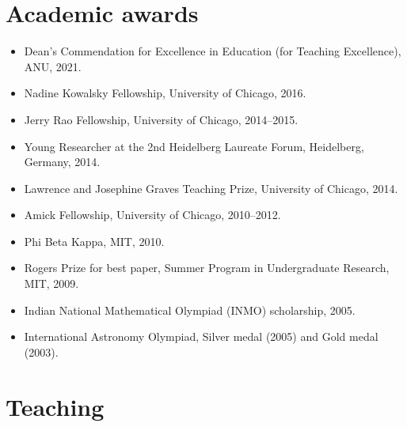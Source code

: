 \documentclass[a4paper]{moderncv}
\begin{document}
\section{Academic awards}
\label{sec:org06173a5}
\begin{itemize}
\item Dean's Commendation for Excellence in Education (for Teaching Excellence), ANU, 2021.
\item Nadine Kowalsky Fellowship, University of Chicago, 2016.
\item Jerry Rao Fellowship, University of Chicago, 2014--2015.
\item Young Researcher at the 2nd Heidelberg Laureate Forum, Heidelberg, Germany, 2014.
\item Lawrence and Josephine Graves Teaching Prize, University of Chicago, 2014.
\item Amick Fellowship, University of Chicago, 2010--2012.
\item Phi Beta Kappa, MIT, 2010.
\item Rogers Prize for best paper, Summer Program in Undergraduate Research, MIT, 2009.
\item Indian National Mathematical Olympiad (INMO) scholarship, 2005.
\item International Astronomy Olympiad, Silver medal (2005) and Gold medal (2003).
\end{itemize}

\section{Teaching}
\label{sec:org43d55dd}
\end{document}
